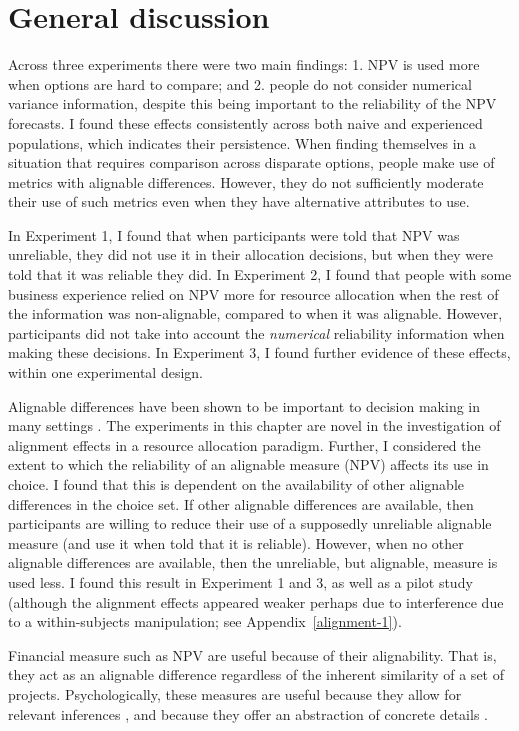 \documentclass[a4paper, nobind, dvipsnames]{templates/ociamthesis}
\theoremstyle{definition}
\theoremstyle{definition}
\theoremstyle{definition}
\theoremstyle{definition}
\theoremstyle{remark}
\begin{document}
\section{General discussion}

Across three experiments there were two main findings: 1. NPV is used more when
options are hard to compare; and 2. people do not consider numerical variance
information, despite this being important to the reliability of the NPV
forecasts. I found these effects consistently across both naive and experienced
populations, which indicates their persistence. When finding themselves in a
situation that requires comparison across disparate options, people make use of
metrics with alignable differences. However, they do not sufficiently moderate
their use of such metrics even when they have alternative attributes to use.

In Experiment 1, I found that when participants were told that NPV was
unreliable, they did not use it in their allocation decisions, but when they
were told that it was reliable they did. In Experiment 2, I found that people
with some business experience relied on NPV more for resource allocation when
the rest of the information was non-alignable, compared to when it was
alignable. However, participants did not take into account the \emph{numerical}
reliability information when making these decisions. In Experiment 3, I found
further evidence of these effects, within one experimental design.

Alignable differences have been shown to be important to decision making in many
settings \autocite{markman2010,markman1995}. The experiments in this chapter are novel
in the investigation of alignment effects in a resource allocation paradigm.
Further, I considered the extent to which the reliability of an alignable
measure (NPV) affects its use in choice. I found that this is dependent on the
availability of other alignable differences in the choice set. If other
alignable differences are available, then participants are willing to reduce
their use of a supposedly unreliable alignable measure (and use it when told
that it is reliable). However, when no other alignable differences are
available, then the unreliable, but alignable, measure is used less. I found
this result in Experiment 1 and 3, as well as a pilot study (although the
alignment effects appeared weaker perhaps due to interference due to a
within-subjects manipulation; see Appendix~\ref{alignment-1}).

Financial measure such as NPV are useful because of their alignability. That is,
they act as an alignable difference regardless of the inherent similarity of a
set of projects. Psychologically, these measures are useful because they allow
for relevant inferences \autocite{lassaline1996}, and because they offer an abstraction
of concrete details \autocite{doumas2013}.
\end{document}
